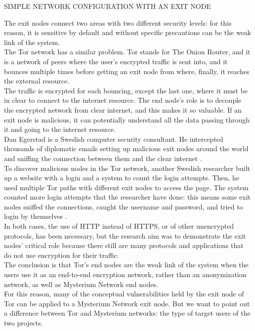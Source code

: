 \documentclass[12pt]{article}
\begin{document}
	\bigbreak
	SIMPLE NETWORK CONFIGURATION WITH AN EXIT NODE\\
	\bigbreak

	The exit nodes connect two areas with two different security levels: for this reason, it is sensitive by default and without specific precautions can be the weak link of the system.\\
	The Tor network has a similar problem. Tor stands for The Onion Router, and it is a network of peers where the user's encrypted traffic is sent into, and it bounces multiple times before getting an exit node from where, finally, it reaches the external resource.\\
	The traffic is encrypted for each bouncing, except the last one, where it must be in clear to connect to the internet resource. The end node's role is to decouple the encrypted network from clear internet, and this makes it so valuable. If an exit node is malicious, it can potentially understand all the data passing through it and going to the internet resource.\\
	Dan Egerstad is a Swedish computer security consultant. He intercepted thousands of diplomatic emails setting up malicious exit nodes around the world and sniffing the connection between them and the clear internet \cite{exitnodeTOR}.\\
	To discover malicious nodes in the Tor network, another Swedish researcher built up a website with a login and a system to count the login attempts. Then, he used multiple Tor paths with different exit nodes to access the page. The system counted more login attempts that the researcher have done: this means some exit nodes sniffed the connections, caught the username and password, and tried to login by themselves \cite{exitnodeTOR2}.\\
	In both cases, the use of HTTP instead of HTTPS, or of other unencrypted protocols, has been necessary, but the research aim was to demonstrate the exit nodes' critical role because there still are many protocols and applications that do not use encryption for their traffic.\\
	The conclusion is that Tor's end nodes are the weak link of the system when the users use it as an end-to-end encryption network, rather than an anonymization network, as well as Mysterium Network end nodes.\\
	For this reason, many of the conceptual vulnerabilities held by the exit node of Tor can be applied to a Mysterium Network exit node. But we want to point out a difference between Tor and Mysterium networks: the type of target users of the two projects.\\
\end{document}
